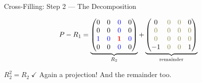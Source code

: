 \documentclass[10pt]{beamer}
\theoremstyle{definition}
\newcommand{\pvt}[1]{{\color{red}\mathbf{#1}}}       %
\newcommand{\crs}[1]{{\color{blue}#1}}                %
\newcommand{\ghost}[1]{{\color{yellow!50!black}#1}}   %
\begin{document}
\begin{frame}{Cross-Filling: Step 2 --- The Decomposition}

$$P - R_1 = \underbrace{\begin{pmatrix} 0 & 0 & \crs{0} & 0 \\ 0 & 0 & \crs{0} & 0 \\ \crs{1} & \crs{0} & \pvt{1} & \crs{0} \\ 0 & 0 & \crs{0} & 0 \end{pmatrix}}_{R_2} + \underbrace{\begin{pmatrix} 0 & \ghost{0} & \ghost{0} & 0 \\ \ghost{0} & \ghost{0} & \ghost{0} & \ghost{0} \\ \ghost{0} & \ghost{0} & \ghost{0} & \ghost{0} \\ -1 & \ghost{0} & \ghost{0} & 1 \end{pmatrix}}_{\text{remainder}}$$

\vspace{0.5em}

$R_2^2 = R_2 \;\checkmark$ \quad Again a projection! And the remainder too.

\end{frame}
\end{document}
